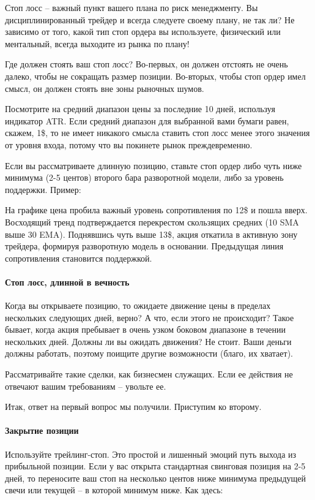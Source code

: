 \documentclass{book}
\begin{document}
Стоп лосс – важный пункт вашего плана по риск менеджменту. Вы дисциплинированный трейдер и всегда следуете своему плану, не так ли? Не зависимо от того, какой тип стоп ордера вы используете, физический или ментальный, всегда выходите из рынка по плану!

Где должен стоять ваш стоп лосс? Во-первых, он должен отстоять не очень далеко, чтобы не сокращать размер позиции. Во-вторых, чтобы стоп ордер имел смысл, он должен стоять вне зоны рыночных шумов.

Посмотрите на средний диапазон цены за последние 10 дней, используя индикатор ATR. Если средний диапазон для выбранной вами бумаги равен, скажем, 1\$, то не имеет никакого смысла ставить стоп лосс менее этого значения от уровня входа, потому что вы покинете рынок преждевременно.

Если вы рассматриваете длинную позицию, ставьте стоп ордер либо чуть ниже минимума (2-5 центов) второго бара разворотной модели, либо за уровень поддержки. Пример:

На графике цена пробила важный уровень сопротивления по 12\$ и пошла
вверх. Восходящий тренд подтверждается перекрестом скользящих средних
(10 SMA выше 30 EMA). Поднявшись чуть выше 13\$, акция откатила в
активную зону трейдера, формируя разворотную модель в
основании. Предыдущая линия сопротивления становится поддержкой.

\paragraph{Стоп лосс, длинной в вечность}

Когда вы открываете позицию, то ожидаете движение цены в пределах нескольких следующих дней, верно? А что, если этого не происходит? Такое бывает, когда акция пребывает в очень узком боковом диапазоне в течении нескольких дней. Должны ли вы ожидать движения? Не стоит. Ваши деньги должны работать, поэтому поищите другие возможности (благо, их хватает).

Рассматривайте такие сделки, как бизнесмен служащих. Если ее действия не отвечают вашим требованиям – увольте ее.

Итак, ответ на первый вопрос мы получили. Приступим ко второму.

\paragraph{Закрытие позиции}

Используйте трейлинг-стоп. Это простой и лишенный эмоций путь выхода из прибыльной позиции. Если у вас открыта стандартная свинговая позиция на 2-5 дней, то переносите ваш стоп на несколько центов ниже минимума предыдущей свечи или текущей – в которой минимум ниже. Как здесь:
\end{document}
